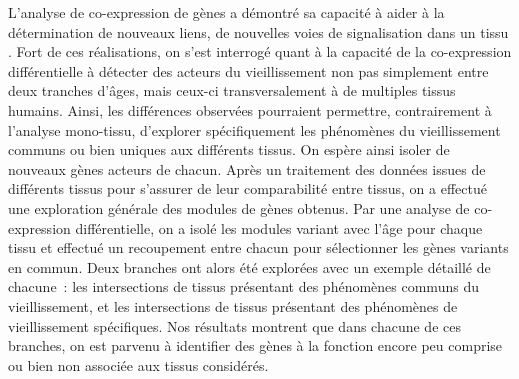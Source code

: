 L'analyse de co-expression de gènes a démontré sa capacité à aider à la détermination de nouveaux liens, de nouvelles voies de signalisation dans un tissu . 
Fort de ces réalisations, on s'est interrogé quant à la capacité de la co-expression différentielle à détecter des acteurs du vieillissement non pas simplement entre deux tranches d'âges, mais ceux-ci transversalement à de multiples tissus humains. 
Ainsi, les différences observées pourraient permettre, contrairement à l'analyse mono-tissu, d'explorer spécifiquement les phénomènes du vieillissement communs ou bien uniques aux différents tissus. On espère ainsi isoler de nouveaux gènes acteurs de chacun.
Après un traitement des données issues de différents tissus pour s'assurer de leur comparabilité entre tissus, on a effectué une exploration générale des modules de gènes obtenus. Par une analyse de co-expression différentielle, on a isolé les modules variant avec l'âge pour chaque tissu et effectué un recoupement entre chacun pour sélectionner les gènes variants en commun. Deux branches ont alors été explorées avec un exemple détaillé de chacune~: les intersections de tissus présentant des phénomènes communs du vieillissement, et les intersections de tissus présentant des phénomènes de vieillissement spécifiques. Nos résultats montrent que dans chacune de ces branches, on est parvenu à identifier des gènes à la fonction encore peu comprise ou bien non associée aux tissus considérés.





